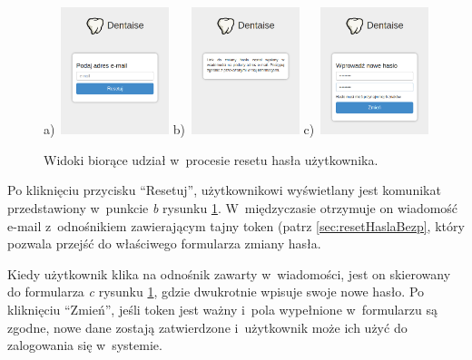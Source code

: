 \documentclass[11pt]{aghdpl}
\begin{document}
\begin{figure}[h!]
	\begin{center}
		a)~\includegraphics[width=0.28\textwidth]{reset-hasla-1}
		\hspace{5mm}
		b)~\includegraphics[width=0.28\textwidth]{reset-hasla-2}
		\hspace{5mm}
		c)~\includegraphics[width=0.28\textwidth]{reset-hasla-3}
	\end{center}
	\caption{Widoki biorące udział w~procesie resetu hasła użytkownika.}
	\label{fig:resetHasla}
\end{figure}

Po kliknięciu przycisku ``Resetuj'', użytkownikowi wyświetlany jest komunikat przedstawiony w~punkcie \emph{b} rysunku \ref{fig:resetHasla}. W~międzyczasie otrzymuje on wiadomość e-mail z~odnośnikiem zawierającym tajny token (patrz \ref{sec:resetHaslaBezp}, który pozwala przejść do właściwego formularza zmiany hasła.

Kiedy użytkownik klika na odnośnik zawarty w~wiadomości, jest on skierowany do formularza \emph{c} rysunku \ref{fig:resetHasla}, gdzie dwukrotnie wpisuje swoje nowe hasło. Po kliknięciu ``Zmień'', jeśli token jest ważny i~pola wypełnione w~formularzu są zgodne, nowe dane zostają zatwierdzone i~użytkownik może ich użyć do zalogowania się w~systemie.
\end{document}
